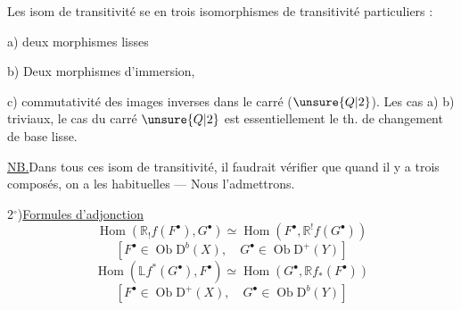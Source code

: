 Les isom de transitivité se 
en trois isomorphismes de transitivité
particuliers :

a) deux morphismes lisses

b) Deux morphismes d'immersion,

c) commutativité des images inverses
dans le carré ($\unsure{Q|2}$). Les cas a) b)
triviaux, le cas du carré $\unsure{Q|2}$ est essentiellement
le th. de changement de base lisse.

\uline{NB.}\quad Dans tous ces isom de
transitivité, il faudrait vérifier que
quand il y a trois composés, on a les
 habituelles --- Nous l'admettrons.

2$^\circ$)\quad \uline{Formules d'adjonction}
\[
\boxed{\operatorname{Hom}(\mathbb{R}_!f(F^\bullet),G^\bullet)
 \simeq\operatorname{Hom}(F^\bullet,\mathbb{R}^!f(G^\bullet))}
\]
\[
[F^\bullet\in\operatorname{Ob}\mathrm D^b(X),\quad
 G^\bullet\in\operatorname{Ob}\mathrm D^+(Y)]
\]
\[
\boxed{\operatorname{Hom}(\mathbb{L}f^*(G^\bullet),F^\bullet)
 \simeq\operatorname{Hom}(G^\bullet,\mathbb{R}f_*(F^\bullet))}
\]
\[
[F^\bullet\in\operatorname{Ob}\mathrm D^+(X),\quad
 G^\bullet\in\operatorname{Ob}\mathrm D^b(Y)]
\]
